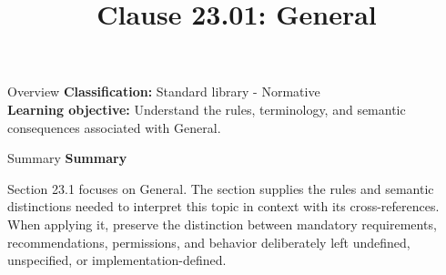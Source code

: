 \documentclass[10pt,letterpaper]{article}
\title{Clause 23.01: General}
\author{}
\date{}
\begin{document}
\maketitle
\begin{CornellOverviewBox}{Overview}
\textbf{Classification:} Standard library - Normative\\[2pt]
\textbf{Learning objective:} Understand the rules, terminology, and semantic consequences associated with General.
\end{CornellOverviewBox}\begin{CornellSummaryBox}{Summary}
{\sffamily\bfseries\color{Accent} Summary}\par\vspace{3pt}Section 23.1 focuses on General. The section supplies the rules and semantic distinctions needed to interpret this topic in context with its cross-references. When applying it, preserve the distinction between mandatory requirements, recommendations, permissions, and behavior deliberately left undefined, unspecified, or implementation-defined.
\end{CornellSummaryBox}
\end{document}
